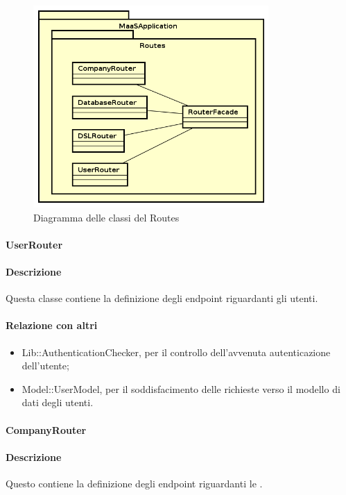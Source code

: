 \begin{figure}[H]
\centering
\includegraphics[width=0.8\textwidth]{res/sections/backend/routes.png}
\caption{Diagramma delle classi del  Routes}
\end{figure}

\paragraph{UserRouter}
\paragraph*{Descrizione}
Questa classe contiene la definizione degli endpoint riguardanti gli utenti. 

\paragraph*{Relazione con altri }
\begin{itemize}
\item Lib::AuthenticationChecker, per il controllo dell'avvenuta autenticazione dell'utente;
\item Model::UserModel, per il soddisfacimento delle richieste verso il modello di dati degli utenti.
\end{itemize}

\paragraph{CompanyRouter}
\paragraph*{Descrizione}
Questo  contiene la definizione degli endpoint riguardanti le .

